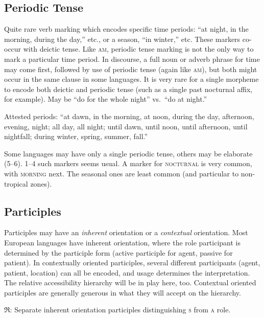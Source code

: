 \documentclass[11pt]{article}
\newcommand{\I}[1]{\textsc{#1}}   %
\newcommand{\rara}[1]{$\mathfrak{R}$: #1}
\begin{document}
{\subsection{Periodic Tense}
Quite rare verb marking which encodes specific time periods: ``at
night, in the morning, during the day,'' etc., or a season, ``in
winter,'' etc.  These markers co-occur with deictic tense.  Like
\I{am}, periodic tense marking is not the only way to mark a
particular time period.  In discourse, a full noun or adverb phrase
for time may come first, followed by use of periodic tense (again like
\I{am}), but both might occur in the same clause in some languages.
It is very rare for a single morpheme to encode both deictic and
periodic tense (such as a single past nocturnal affix, for example).
May be ``do for the whole night'' vs.\ ``do at night.''

Attested periods: ``at dawn, in the morning, at noon, during the day,
afternoon, evening, night; all day, all night; until dawn, until noon,
until afternoon, until nightfall; during winter, spring, summer,
fall.''

Some languages may have only a single periodic tense, others may be
elaborate (5--6).  1--4 such markers seems usual.  A marker for
\I{nocturnal} is very common, with \I{morning} next.  The seasonal
ones are least common (and particular to non-tropical zones).


\subsection{Participles}
Participles may have an \textit{inherent} orientation or a
\textit{contextual} orientation.  Most European languages have
inherent orientation, where the role participant is determined by the
participle form (active participle for agent, passive for patient).
In contextually oriented participles, several different participants
(agent, patient, location) can all be encoded, and usage determines
the interpretation.  The relative accessibility hierarchy will be in
play here, too.  Contextual oriented participles are generally
generous in what they will accept on the hierarchy.

\rara{Separate inherent orientation participles distinguishing \I{s}
from \I{a} role.}

}
\end{document}
